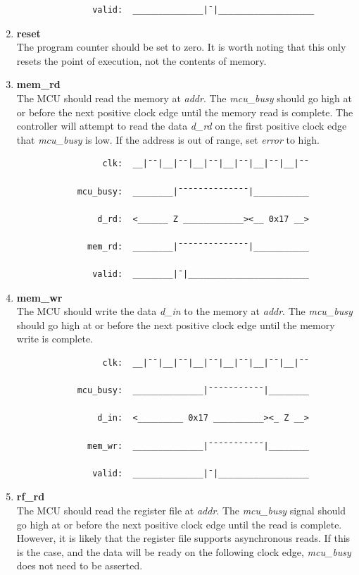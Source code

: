 \documentclass[10pt,a4paper]{article}
\begin{document}
\begin{enumerate}
\begin{verbatim}
               valid:  ______________|¯|___________________
        \end{verbatim}

    \item\textbf{reset}\\
    The program counter should be set to zero. It is worth noting that this only resets the point of
    execution, not the contents of memory.

    \item\textbf{mem\_rd}\\
    The MCU should read the memory at \emph{addr}. The \emph{mcu\_busy} should go
     high at or before the next positive clock edge until the memory read is complete. The
    controller will attempt to read the data \emph{d\_rd} on the first positive clock edge that
    \emph{mcu\_busy} is low. If the address is out of range, set \emph{error} to high.

        \begin{verbatim}
                 clk:  __|¯¯|__|¯¯|__|¯¯|__|¯¯|__|¯¯|__|¯¯

            mcu_busy:  ________|¯¯¯¯¯¯¯¯¯¯¯¯¯¯|___________

                d_rd:  <______ Z ____________><__ 0x17 __>

              mem_rd:  ________|¯¯¯¯¯¯¯¯¯¯¯¯¯¯|___________

               valid:  ________|¯|________________________
        \end{verbatim}

    \newpage
    \item\textbf{mem\_wr}\\
    The MCU should write the data \emph{d\_in} to the memory at \emph{addr}. The \emph{mcu\_busy}
    should go high at or before the next positive clock edge until the memory write is complete.

        \begin{verbatim}
                 clk:  __|¯¯|__|¯¯|__|¯¯|__|¯¯|__|¯¯|__|¯¯

            mcu_busy:  ______________|¯¯¯¯¯¯¯¯¯¯¯|________

                d_in:  <_________ 0x17 __________><_ Z __>

              mem_wr:  ______________|¯¯¯¯¯¯¯¯¯¯¯|________

               valid:  ______________|¯|__________________
        \end{verbatim}

    \item\textbf{rf\_rd}\\
    The MCU should read the register file at \emph{addr}. The \emph{mcu\_busy} signal should go
    high at or before the next positive clock edge until the read is complete. However, it is
    likely that the register file supports asynchronous reads. If this is the case, and the data
    will be ready on the following clock edge, \emph{mcu\_busy} does not need to be asserted.


\end{enumerate}
\end{document}
